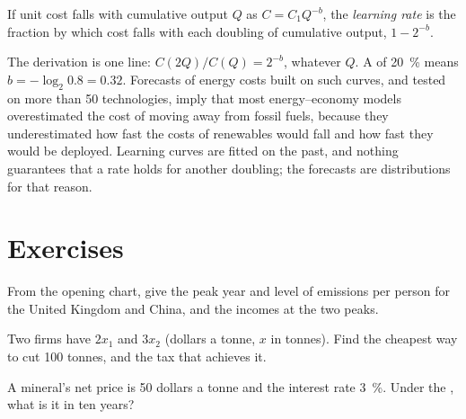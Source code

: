 \begin{definition}\label{def:b3:environmental-and-resource-economics:learning-rate}
If unit cost falls with cumulative output $Q$ as $C = C_1 Q^{-b}$, the \emph{learning rate} is the
fraction by which cost falls with each doubling of cumulative output, $1 - 2^{-b}$.
\end{definition}

The derivation is one line: $C(2Q)/C(Q) = 2^{-b}$, whatever $Q$. A  of 20~\% means $b = -\log_2 0.8 = 0.32$. Forecasts of
energy costs built on such curves, and tested on more than 50 technologies, imply that most
energy--economy models overestimated the cost of moving away from fossil fuels,
because they underestimated how fast the costs of renewables would fall and how fast
they would be deployed. %
Learning curves are fitted on the past, and nothing guarantees that a rate holds
for another doubling; the forecasts are distributions for that reason.

\section{Exercises}\label{sec:b3:environmental-and-resource-economics:exercises}

\begin{exercise}[$\star$]\label{exo:b3:environmental-and-resource-economics:1}
From the opening chart, give the peak year and level of emissions per person for the
United Kingdom and China, and the incomes at the two peaks.
\end{exercise}

\begin{exercise}[$\star$]\label{exo:b3:environmental-and-resource-economics:2}
Two firms have  $2x_1$ and $3x_2$ (dollars a tonne, $x$ in tonnes). Find the cheapest way to cut
100 tonnes, and the tax that achieves it.
\end{exercise}

\begin{exercise}[$\star$]\label{exo:b3:environmental-and-resource-economics:3}
A mineral's net price is 50 dollars a tonne and the interest rate 3~\%. Under the , what is it in ten
years?
\end{exercise}

